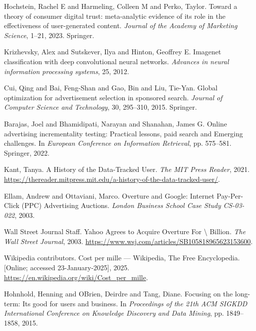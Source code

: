 \begin{thebibliography}{99}
 Hochstein, Rachel E and Harmeling, Colleen M and Perko, Taylor. {T}oward a theory of consumer digital trust: meta-analytic evidence of its role in the effectiveness of user-generated content. \textit{Journal of the Academy of Marketing Science}, 1--21, 2023. Springer.

 Krizhevsky, Alex and Sutskever, Ilya and Hinton, Geoffrey E. {I}magenet classification with deep convolutional neural networks. \textit{Advances in neural information processing systems}, 25, 2012.

 Cui, Qing and Bai, Feng-Shan and Gao, Bin and Liu, Tie-Yan. {G}lobal optimization for advertisement selection in sponsored search. \textit{Journal of Computer Science and Technology}, 30, 295--310, 2015. Springer.

 Barajas, Joel and Bhamidipati, Narayan and Shanahan, James G. {O}nline advertising incrementality testing: {P}ractical lessons, paid search and {E}merging challenges. In \textit{European Conference on Information Retrieval}, pp. 575--581. Springer, 2022.

 Kant, Tanya. {A} History of the {D}ata-{T}racked {U}ser. \textit{The MIT Press Reader}, 2021. \url{https://thereader.mitpress.mit.edu/a-history-of-the-data-tracked-user/}.

 Ellam, Andrew and Ottaviani, Marco. {O}verture and {G}oogle: {I}nternet {P}ay-{P}er-{C}lick ({P}PC) {A}dvertising {A}uctions. \textit{London Business School Case Study CS-03-022}, 2003.

 Wall Street Journal Staff. {Y}ahoo {A}grees to {A}cquire {O}verture {F}or \textbackslash {} {B}illion. \textit{The Wall Street Journal}, 2003. \url{https://www.wsj.com/articles/SB105818965623153600}.

 Wikipedia contributors. {C}ost per mille --- {W}ikipedia, {T}he {F}ree {E}ncyclopedia. [Online; accessed 23-January-2025], 2025. \url{https://en.wikipedia.org/wiki/Cost\_per\_mille}.

 Hohnhold, Henning and O\textquotesingle Brien, Deirdre and Tang, Diane. {F}ocusing on the long-term: {I}t\textquotesingle s good for users and business. In \textit{Proceedings of the 21th ACM SIGKDD International Conference on Knowledge Discovery and Data Mining}, pp. 1849--1858, 2015.


\end{thebibliography}
